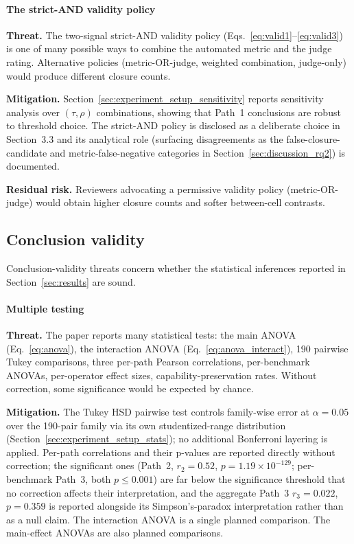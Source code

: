 \paragraph{The strict-AND validity policy}

\textbf{Threat.} The two-signal strict-AND validity policy (Eqs.~\ref{eq:valid1}--\ref{eq:valid3}) is one of many possible ways to combine the automated metric and the judge rating. Alternative policies (metric-OR-judge, weighted combination, judge-only) would produce different closure counts.

\textbf{Mitigation.} Section~\ref{sec:experiment_setup_sensitivity} reports sensitivity analysis over $(\tau, \rho)$ combinations, showing that Path~1 conclusions are robust to threshold choice. The strict-AND policy is disclosed as a deliberate choice in Section~3.3 and its analytical role (surfacing disagreements as the false-closure-candidate and metric-false-negative categories in Section~\ref{sec:discussion_rq2}) is documented.

\textbf{Residual risk.} Reviewers advocating a permissive validity policy (metric-OR-judge) would obtain higher closure counts and softer between-cell contrasts.

\subsection{Conclusion validity}

Conclusion-validity threats concern whether the statistical inferences reported in Section~\ref{sec:results} are sound.

\paragraph{Multiple testing}

\textbf{Threat.} The paper reports many statistical tests: the main ANOVA (Eq.~\ref{eq:anova}), the interaction ANOVA (Eq.~\ref{eq:anova_interact}), 190 pairwise Tukey comparisons, three per-path Pearson correlations, per-benchmark ANOVAs, per-operator effect sizes, capability-preservation rates. Without correction, some significance would be expected by chance.

\textbf{Mitigation.} The Tukey HSD pairwise test controls family-wise error at $\alpha = 0.05$ over the 190-pair family via its own studentized-range distribution (Section~\ref{sec:experiment_setup_stats}); no additional Bonferroni layering is applied. Per-path correlations and their p-values are reported directly without correction; the significant ones (Path~2, $r_2 = 0.52$, $p = 1.19 \times 10^{-129}$; per-benchmark Path~3, both $p \leq 0.001$) are far below the significance threshold that no correction affects their interpretation, and the aggregate Path~3 $r_3 = 0.022$, $p = 0.359$ is reported alongside its Simpson's-paradox interpretation rather than as a null claim. The interaction ANOVA is a single planned comparison. The main-effect ANOVAs are also planned comparisons.

